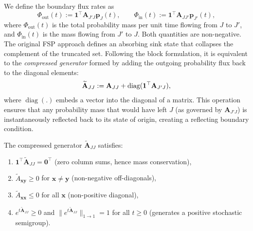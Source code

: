 \documentclass[review,onefignum,onetabnum]{siamart171218}
\begin{document}
We define the boundary flux rates as
\begin{equation}
\label{eq:flux-defs}
\Phi_{\mathrm{out}}(t) := \mathbf{1}^\top \mathbf{A}_{J'J}\boldsymbol{p}_J(t), \qquad \Phi_{\mathrm{in}}(t) := \mathbf{1}^\top \mathbf{A}_{JJ'}\boldsymbol{p}_{J'}(t),
\end{equation}
where $\Phi_{\mathrm{out}}(t)$ is the total probability mass per unit time flowing from $J$ to $J'$, and $\Phi_{\mathrm{in}}(t)$ is the mass flowing from $J'$ to $J$. Both quantities are non-negative. The original FSP approach defines an absorbing sink state that collapses the complement of the truncated set. Following the block formulation, it is equivalent to the \textit{compressed generator} formed by adding the outgoing probability flux back to the diagonal elements:
\begin{equation}
\label{eq:compressed-generator}
\widetilde{\mathbf{A}}_{JJ} := \mathbf{A}_{JJ} + \diag(\mathbf{1}^\top \mathbf{A}_{J'J}),
\end{equation}
where $\operatorname{diag}(.)$ embeds a vector into the diagonal of a matrix. This operation ensures that any probability mass that would have left $J$ (as governed by $\mathbf{A}_{J'J}$) is instantaneously reflected back to its state of origin, creating a reflecting boundary condition.

\begin{proposition}
\label{prop:compressed-generator}
The compressed generator $\widetilde{\mathbf{A}}_{JJ}$ satisfies:
\begin{enumerate}
\item $\mathbf{1}^\top \widetilde{\mathbf{A}}_{JJ} = \mathbf{0}^\top$ (zero column sums, hence mass conservation),
\item $\widetilde{A}_{\boldsymbol{x}\boldsymbol{y}} \geq 0$ for $\boldsymbol{x} \neq \boldsymbol{y}$ (non-negative off-diagonals),
\item $\widetilde{A}_{\boldsymbol{x}\boldsymbol{x}} \leq 0$ for all $\boldsymbol{x}$ (non-positive diagonal),
\item $e^{t\widetilde{\mathbf{A}}_{JJ}} \geq 0$ and $\|e^{t\widetilde{\mathbf{A}}_{JJ}}\|_{1 \to 1} = 1$ for all $t \geq 0$ (generates a positive stochastic semigroup).
\end{enumerate}
\end{proposition}
\end{document}
